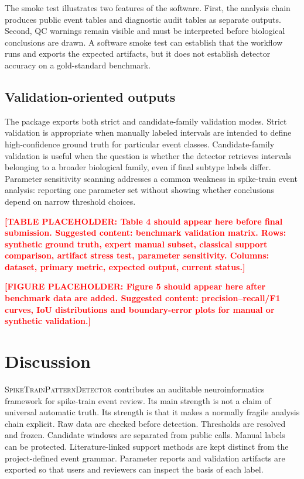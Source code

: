 \documentclass[pdflatex,sn-apa]{sn-jnl}
\newcommand{\stpd}{\textsc{SpikeTrainPatternDetector}}
\newcommand{\TODOFIG}[1]{\par\medskip\noindent\textbf{\textcolor{red}{[FIGURE PLACEHOLDER: #1]}}\par\medskip}
\newcommand{\TODOTAB}[1]{\par\medskip\noindent\textbf{\textcolor{red}{[TABLE PLACEHOLDER: #1]}}\par\medskip}
\begin{document}
The smoke test illustrates two features of the software. First, the analysis chain produces public event tables and diagnostic audit tables as separate outputs. Second, QC warnings remain visible and must be interpreted before biological conclusions are drawn. A software smoke test can establish that the workflow runs and exports the expected artifacts, but it does not establish detector accuracy on a gold-standard benchmark.

\subsection{Validation-oriented outputs}

The package exports both strict and candidate-family validation modes. Strict validation is appropriate when manually labeled intervals are intended to define high-confidence ground truth for particular event classes. Candidate-family validation is useful when the question is whether the detector retrieves intervals belonging to a broader biological family, even if final subtype labels differ. Parameter sensitivity scanning addresses a common weakness in spike-train event analysis: reporting one parameter set without showing whether conclusions depend on narrow threshold choices.

\TODOTAB{Table 4 should appear here before final submission. Suggested content: benchmark validation matrix. Rows: synthetic ground truth, expert manual subset, classical support comparison, artifact stress test, parameter sensitivity. Columns: dataset, primary metric, expected output, current status.}

\TODOFIG{Figure 5 should appear here after benchmark data are added. Suggested content: precision--recall/F1 curves, IoU distributions and boundary-error plots for manual or synthetic validation.}

\section{Discussion}

\stpd{} contributes an auditable neuroinformatics framework for spike-train event review. Its main strength is not a claim of universal automatic truth. Its strength is that it makes a normally fragile analysis chain explicit. Raw data are checked before detection. Thresholds are resolved and frozen. Candidate windows are separated from public calls. Manual labels can be protected. Literature-linked support methods are kept distinct from the project-defined event grammar. Parameter reports and validation artifacts are exported so that users and reviewers can inspect the basis of each label.
\end{document}
